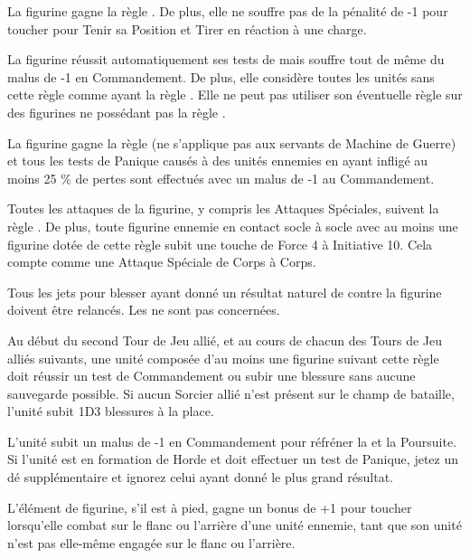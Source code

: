 La figurine gagne la règle \thunderouscharge{}. De plus, elle ne souffre pas de la pénalité de -1 pour toucher pour Tenir sa Position et Tirer en réaction à une charge.

\armyspecialruleentry{\chosenofashuruk{}}

La figurine réussit automatiquement ses tests de \fear{} mais souffre tout de même du malus de -1 en Commandement. De plus, elle considère toutes les unités sans cette règle comme ayant la règle \insignificant{}. Elle ne peut pas utiliser son éventuelle règle \engineer{} sur des figurines ne possédant pas la règle \chosenofashuruk{}.

\armyspecialruleentry{\daemonicinfusion{}}

La figurine gagne la règle \magicalattacks{} (ne s'applique pas aux servants de Machine de Guerre) et tous les tests de Panique causés à des unités ennemies en ayant infligé au moins 25 \% de pertes sont effectués avec un malus de -1 au Commandement.

\armyspecialruleentry{\volcanicembrace{}}

Toutes les attaques de la figurine, y compris les Attaques Spéciales, suivent la règle \flamingattacks{}. De plus, toute figurine ennemie en contact socle à socle avec au moins une figurine dotée de cette règle subit une touche de Force 4 à Initiative 10. Cela compte comme une Attaque Spéciale de Corps à Corps.

\armyspecialruleentry{\shacklesoffire{}}

Tous les jets pour blesser ayant donné un résultat naturel de  contre la figurine doivent être relancés. Les \magicalattacks{} ne sont pas concernées.

Au début du second Tour de Jeu allié, et au cours de chacun des Tours de Jeu alliés suivants, une unité composée d'au moins une figurine suivant cette règle doit réussir un test de Commandement ou subir une blessure sans aucune sauvegarde possible. Si aucun Sorcier allié n'est présent sur le champ de bataille, l'unité subit 1D3 blessures à la place.

\armyspecialruleentry{\unruly{}}

L'unité subit un malus de -1 en Commandement pour réfréner la \frenzy{} et la Poursuite. Si l'unité est en formation de Horde et doit effectuer un test de Panique, jetez un dé supplémentaire et ignorez celui ayant donné le plus grand résultat.

\armyspecialruleentry{\opportunist{}}

L'élément de figurine, s'il est à pied, gagne un bonus de +1 pour toucher lorsqu'elle combat sur le flanc ou l'arrière d'une unité ennemie, tant que son unité n'est pas elle-même engagée sur le flanc ou l'arrière.


